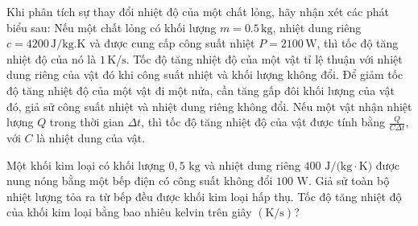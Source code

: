 \begin{ex}
Khi phân tích sự thay đổi nhiệt độ của một chất lỏng, hãy nhận xét các phát biểu sau:
\choiceTF
{Nếu một chất lỏng có khối lượng $m = 0.5 \, \text{kg}$, nhiệt dung riêng $c = 4200 \, \text{J/kg.K}$ và được cung cấp công suất nhiệt $P = 2100 \, \text{W}$, thì tốc độ tăng nhiệt độ của nó là $1 \, \text{K/s}$.}
{Tốc độ tăng nhiệt độ của một vật tỉ lệ thuận với nhiệt dung riêng của vật đó khi công suất nhiệt và khối lượng không đổi.}
{Để giảm tốc độ tăng nhiệt độ của một vật đi một nửa, cần tăng gấp đôi khối lượng của vật đó, giả sử công suất nhiệt và nhiệt dung riêng không đổi.}
{Nếu một vật nhận nhiệt lượng $Q$ trong thời gian $\Delta t$, thì tốc độ tăng nhiệt độ của vật được tính bằng $\frac{Q}{C \Delta t}$, với $C$ là nhiệt dung của vật.}
\end{ex}

\begin{ex}
Một khối kim loại có khối lượng $0,5\text{ kg}$ và nhiệt dung riêng $400\text{ J/(kg}\cdot\text{K)}$ được nung nóng bằng một bếp điện có công suất không đổi $100\text{ W}$. Giả sử toàn bộ nhiệt lượng tỏa ra từ bếp đều được khối kim loại hấp thụ. Tốc độ tăng nhiệt độ của khối kim loại bằng bao nhiêu kelvin trên giây $(\text{K/s})$?
\end{ex}

